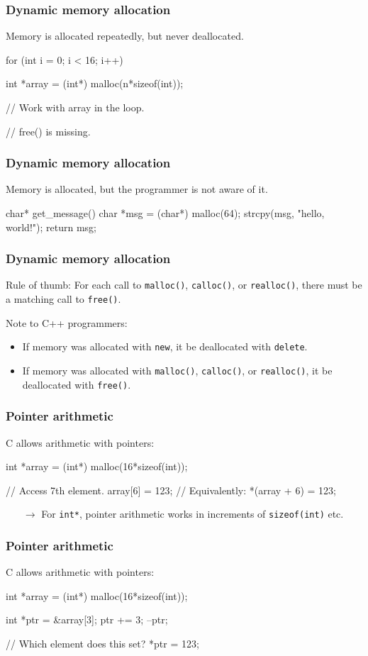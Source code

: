 \documentclass[12pt,t]{beamer}
\let\emph\relax %
\newcommand{\conclude}[1]{%
  \begin{itemize}
    \item[$\rightarrow$]#1
  \end{itemize}
}
\begin{document}
  \begin{frame}[fragile]
    \frametitle{Dynamic memory allocation}

    \emph{Example 1:} Memory is allocated repeatedly, but never deallocated.
    \begin{code}
for (int i = 0; i < 16; i++) {
  int *array = (int*) malloc(n*sizeof(int));

  // Work with array in the loop.

  // free() is missing.
}
    \end{code}
  \end{frame}

  \begin{frame}[fragile]
    \frametitle{Dynamic memory allocation}

    \emph{Example 2:} Memory is allocated, but the programmer is not aware of it.
    \begin{code}
char* get_message()
{
  char *msg = (char*) malloc(64);
  strcpy(msg, "hello, world!");
  return msg;
}
    \end{code}
  \end{frame}

  \begin{frame}[fragile]
    \frametitle{Dynamic memory allocation}

    Rule of thumb: For each call to \texttt{malloc()}, \texttt{calloc()}, or \texttt{realloc()}, there must be a matching call to \texttt{free()}.

    Note to C++ programmers:
    \begin{itemize}
      \item If memory was allocated with \texttt{new}, it \emph{must} be deallocated with \texttt{delete}.
      \item If memory was allocated with \texttt{malloc()}, \texttt{calloc()}, or \texttt{realloc()}, it \emph{must} be deallocated with \texttt{free()}.
    \end{itemize}
  \end{frame}

  \begin{frame}[fragile]
    \frametitle{Pointer arithmetic}

    C allows arithmetic with pointers:
    \begin{code}
int *array = (int*) malloc(16*sizeof(int));

// Access 7th element.
array[6] = 123;
// Equivalently:
*(array + 6) = 123;
    \end{code}

    \conclude{For \texttt{int*}, pointer arithmetic works in increments of \texttt{sizeof(int)} etc.}
  \end{frame}

  \begin{frame}[fragile]
    \frametitle{Pointer arithmetic}

    C allows arithmetic with pointers:
    \begin{code}
int *array = (int*) malloc(16*sizeof(int));

int *ptr = &array[3];
ptr += 3;
--ptr;

// Which element does this set?
*ptr = 123;
    \end{code}
  \end{frame}
\end{document}
